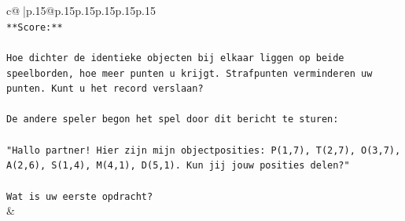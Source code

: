 \documentclass{article}
\begin{document}
{\begin{supertabular}{c@{$\;$}|p{.15\linewidth}@{}p{.15\linewidth}p{.15\linewidth}p{.15\linewidth}p{.15\linewidth}p{.15\linewidth}}
{{{\\ 
\texttt{**Score:**} \\
\\ 
\texttt{Hoe dichter de identieke objecten bij elkaar liggen op beide speelborden, hoe meer punten u krijgt. Strafpunten verminderen uw punten. Kunt u het record verslaan?} \\
\\ 
\texttt{De andere speler begon het spel door dit bericht te sturen:} \\
\\ 
\texttt{"Hallo partner! Hier zijn mijn objectposities: P(1,7), T(2,7), O(3,7), A(2,6), S(1,4), M(4,1), D(5,1). Kun jij jouw posities delen?"} \\
\\ 
\texttt{Wat is uw eerste opdracht?} \\
            }
        }
    }
    & \\ \\


\end{supertabular}}
\end{document}
